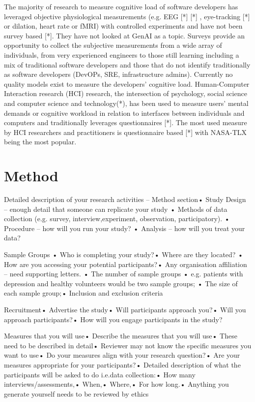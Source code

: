 \documentclass[jou, 12pt]{apa7}
\begin{document}
The majority of research to measure cognitive load of software developers has leveraged objective physiological measurements (e.g. EEG [*] [*] , eye-tracking [*] or dilation, heart rate or fMRI) with controlled experiments and have not been survey based [*]. They have not looked at GenAI as a topic. Surveys provide an opportunity to collect the subjective measurements from a wide array of individuals, from very experienced engineers to those still learning including a mix of traditional software developers and those that do not identify traditionally as software developers (DevOPs, SRE, infrastructure admins). Currently no quality models exist to measure the developers’ cognitive load. Human-Computer Interaction research (HCI) research, the intersection of psychology, social science and computer science and technology(*), has been used to measure users' mental demands or cognitive workload in relation to interfaces between individuals and computers and traditionally leverages questionnaires [*]. The most used measure by HCI researchers and practitioners is questionnaire based [*] with NASA-TLX being the most popular.

\section{Method}
Detailed description of your research activities – Method section• Study Design – enough detail that someone can replicate your study
• Methods of data collection (e.g. survey, interview,experiment, observation, participatory).
• Procedure – how will you run your study?
• Analysis – how will you treat your data?


Sample Groups
• Who is completing your study?• Where are they located?
• How are you accessing your potential participants?• Any organisation affiliation – need supporting letters.
• The number of sample groups
     • e.g. patients with depression and healthy volunteers would be two sample groups;
• The size of each sample group;• Inclusion and exclusion criteria





Recruitment• Advertise the study• Will participants approach you?• Will you approach participants?• How will you engage participants in the study?




Measures that you will use• Describe the measures that you will use• These need to be described in detail• Reviewer may not know the specific measures you want to use• Do your measures align with your research question?• Are your measures appropriate for your participants?• Detailed description of what the participants will be asked to do i.e.data collection:• How many interviews/assessments,• When,• Where,• For how long.• Anything you generate yourself needs to be reviewed by ethics
\end{document}
